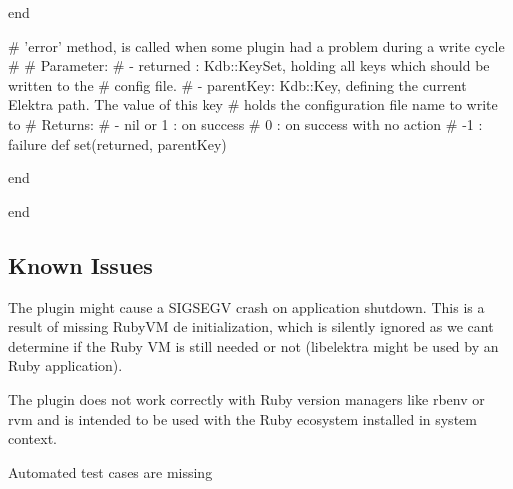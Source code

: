 \begin{DoxyCode}
  end


  # 'error' method, is called when some plugin had a problem during a write cycle
  #
  # Parameter:
  #  - returned : Kdb::KeySet, holding all keys which should be written to the
  #               config file.
  #  - parentKey: Kdb::Key, defining the current Elektra path. The value of this key
  #               holds the configuration file name to write to
  # Returns:
  #  - nil or 1 : on success
  #           0 : on success with no action
  #          -1 : failure
  def set(returned, parentKey)

  end

end
\end{DoxyCode}


\subsection*{Known Issues}


\begin{DoxyItemize}
\item The plugin might cause a S\+I\+G\+S\+E\+GV crash on application shutdown. This is a result of missing Ruby\+VM de initialization, which is silently ignored as we can\textquotesingle{}t determine if the Ruby VM is still needed or not (libelektra might be used by an Ruby application).
\item The plugin does not work correctly with Ruby version managers like {\ttfamily rbenv} or {\ttfamily rvm} and is intended to be used with the Ruby ecosystem installed in system context.
\item Automated test cases are missing 
\end{DoxyItemize}